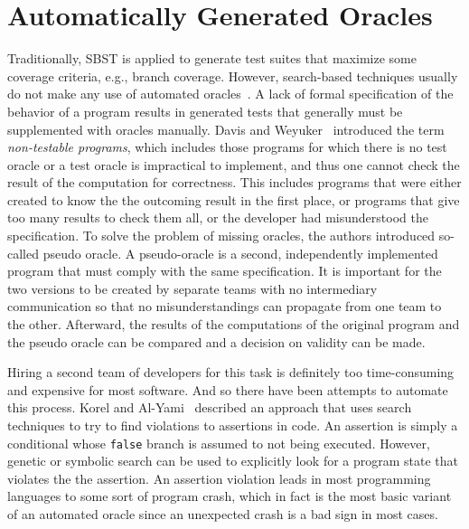 \documentclass[paper=a4,%
  twoside,%
  BCOR4mm,%
  abstract=true,%
  toc=bibliography,%
  chapterprefix=true,%
  toc=bibliographynumbered,%
  open=right,%
  english,%
  pagesize=pdftex]{scrreprt}
\begin{document}
\section{Automatically Generated Oracles}
\label{sec:generated-oracles}
Traditionally, \ac{SBST} is applied to generate test suites that maximize some coverage criteria, e.g., branch coverage. However, search-based techniques usually do not make any use of automated oracles~\cite{Fraser2013}. A lack of formal specification of the behavior of a program results in generated tests that generally must be supplemented with oracles manually. Davis and Weyuker~\cite{10.1145/800175.809889} introduced the term \textit{non-testable programs}, which includes those programs for which there is no test oracle or a test oracle is impractical to implement, and thus one cannot check the result of the computation for correctness. This includes programs that were either created to know the the outcoming result in the first place, or programs that give too many results to check them all, or the developer had misunderstood the specification. To solve the problem of missing oracles, the authors introduced so-called pseudo oracle. A pseudo-oracle is a second, independently implemented program that must comply with the same specification. It is important for the two versions to be created by separate teams with no intermediary communication so that no misunderstandings can propagate from one team to the other. Afterward, the results of the computations of the original program and the pseudo oracle can be compared and a decision on validity can be made.

Hiring a second team of developers for this task is definitely too time-consuming and expensive for most software. And so there have been attempts to automate this process. Korel and Al-Yami~\cite{Korel1996} described an approach that uses search techniques to try to find violations to assertions in code. An assertion is simply a conditional whose \texttt{false} branch is assumed to not being executed. However, genetic or symbolic search can be used to explicitly look for a program state that violates the the assertion. An assertion violation leads in most programming languages to some sort of program crash, which in fact is the most basic variant of an automated oracle since an unexpected crash is a bad sign in most cases. 
\end{document}
